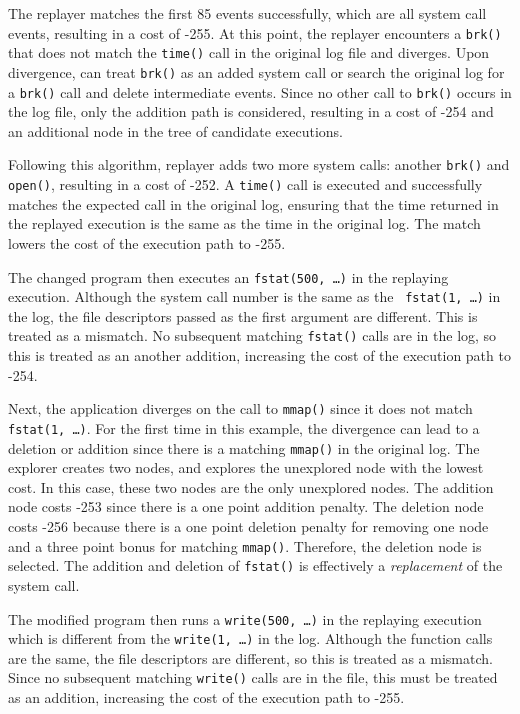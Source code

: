 The replayer matches the first 85 events successfully,
which are all system call events, resulting in a cost of -255.
At this point, the replayer encounters a {\tt brk()}
that does not match the {\tt time()} call in the original log
file and diverges. Upon divergence, {\dora} can treat {\tt brk()}
as an added system call or search the original log for a {\tt brk()} call and
delete intermediate events. Since no other call to {\tt brk()} occurs in the log
file, only the addition path is considered, resulting in a cost of -254 and an
additional node in the tree of candidate executions.

Following this algorithm, replayer adds two more system calls:
another {\tt brk()} and {\tt open()}, resulting in a cost of
-252.
A {\tt time()} call is executed and successfully
matches the expected call in the original log, ensuring that the time returned
in the replayed execution is the same as the time in the original log. The match
lowers the cost of the execution path to -255.

The changed program then executes an {\tt fstat(500, \ldots)} in the
replaying execution.  Although the system call number is the same as the {\tt
fstat(1, \ldots)} in the log, the file
descriptors passed as the first argument are different.  This is treated as a
mismatch.  No
subsequent matching {\tt fstat()} calls are in the log, so this is 
treated as an another addition, increasing the cost of the execution path to -254.

Next, the application diverges on the call to {\tt mmap()}
since it does not match {\tt fstat(1, \ldots)}. For the
first time in this example, the divergence can lead to a deletion or addition
since
there is a matching {\tt mmap()} in the original log. The explorer creates two
nodes, and explores the unexplored node with the lowest cost. In this case,
these two nodes are the only unexplored nodes. The
addition node costs -253 since there is a one point addition penalty. The deletion
node costs -256 because there is a one point deletion penalty for removing one
node and a three point bonus for matching {\tt mmap()}. Therefore, the deletion
node is selected. The addition and deletion of {\tt fstat()} is effectively a
\emph{replacement} of the system call.

The modified program then runs a {\tt write(500, \ldots)} in the
replaying execution which is different from the {\tt write(1, \ldots)}
in the log. Although the function calls are the same, the file
descriptors are different, so this is treated as a mismatch.  Since no
subsequent matching {\tt write()} calls are in the file, this must be
treated as an addition, increasing the cost of the execution path to -255.

